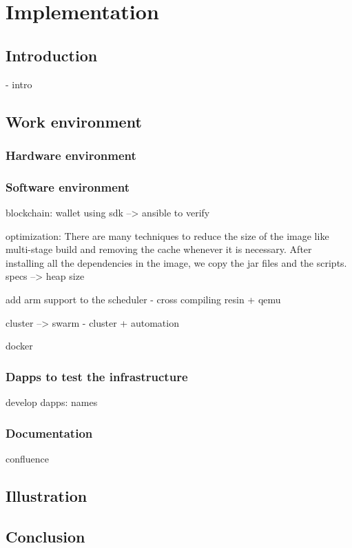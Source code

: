 

\chapter{Implementation}


\section{Introduction}
- intro

\section{Work environment}
    \subsection{Hardware environment}

    \subsection{Software environment}

    blockchain: wallet using sdk --> ansible to verify

    optimization: There are many techniques to reduce the size of the
    image like multi-stage build and removing the cache whenever it is necessary. After installing all
    the dependencies in the image, we copy the jar files and the scripts.
    specs --> heap size

    add arm support to the scheduler - cross compiling resin + qemu

    cluster --> swarm - cluster + automation

    docker

    \subsection{Dapps to test the infrastructure}
    develop dapps: names


    \subsection{Documentation}
    confluence

\section{Illustration}

\section{Conclusion}

